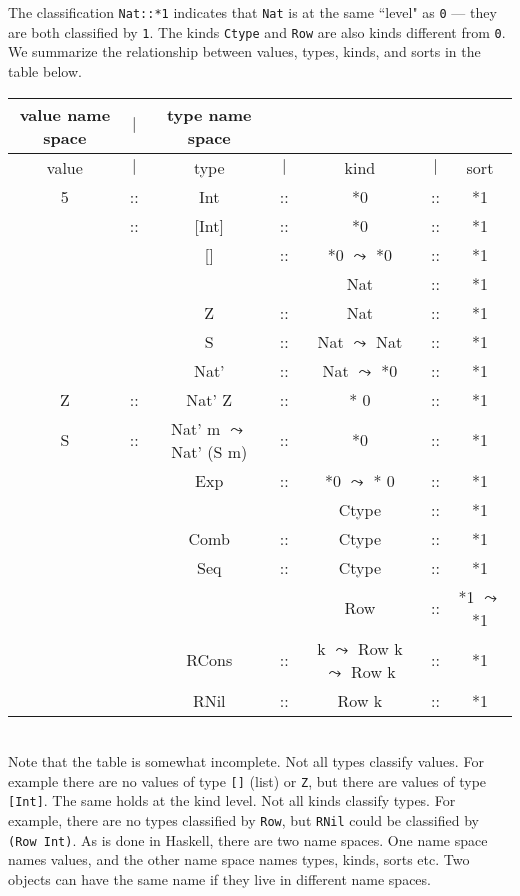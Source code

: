 \documentclass[10pt,twoside]{article}
\begin{document}
The classification {\tt Nat::*1} indicates that {\tt Nat} is at the same
``level" as {\tt *0} --- they are both classified by {\tt *1}.
The kinds {\tt Ctype} and {\tt Row} are also kinds different from {\tt *0}. We summarize the relationship
between values, types, kinds, and sorts in the table below.\\

{\small
\begin{tabular}{|ccccccc|}
{\scriptsize value name space} & $\mid$ & {\scriptsize type name space} \\ \hline
value & $\mid$ & type & $\mid$ & kind &$\mid$ & sort \\ \hline
5     &::& Int  &::& *0  &::& *1  \\ \hline
[2]   &::& [Int]&::& *0  &::& *1  \\ \hline
      &  & []   &::& *0 $\leadsto$ *0 &::& *1\\ \hline
      &  &      &  & Nat &::& *1\\ \hline  
      &  &  Z   &::& Nat &::& *1\\ \hline   
      &  &  S   &::& Nat $\leadsto$ Nat &::& *1\\ \hline 
      &  & Nat'   &::& Nat $\leadsto$ *0 &::& *1 \\ \hline  
  Z   &::& Nat' Z &::& * 0               &::& *1 \\ \hline   
  S   &::& Nat' m $\leadsto$ Nat' (S m)  &::& *0 &::& *1\\ \hline        
      &  & Exp  &::&  *0 $\leadsto$ * 0 &::& *1\\ \hline
      &  &      &  & Ctype   &::& *1\\ \hline
      &  & Comb &::& Ctype   &::& *1\\ \hline
      &  & Seq  &::& Ctype   &::& *1\\ \hline
      &  &      &  & Row  &::& *1 $\leadsto$ *1\\ \hline
      &  & RCons&::& k $\leadsto$ Row k $\leadsto$ Row k &::& *1\\ \hline
      &  & RNil &::& Row k &::& *1\\ \hline      
\end{tabular}} \\

Note that the table is somewhat incomplete. Not all types classify values.
For example there are no values of type \verb+[]+ (list) or \verb+Z+, but
there are values of type \verb+[Int]+. The same holds at the kind level.
Not all kinds classify types. For example, there are no types classified
by \verb+Row+, but {\tt RNil} could be classified by \verb+(Row Int)+. As
is done in Haskell, there are two name spaces. One name space names
values, and the other name space names types, kinds, sorts etc. Two
objects can have the same name if they live in different name spaces.
\end{document}
